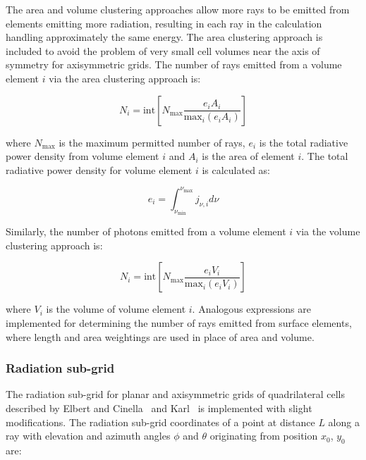 \noindent The area and volume clustering approaches allow more rays to be emitted from elements emitting more radiation, resulting in each ray in the calculation handling approximately the same energy.
The area clustering approach is included to avoid the problem of very small cell volumes near the axis of symmetry for axisymmetric grids.
The number of rays emitted from a volume element $i$ via the area clustering approach is:

 \begin{equation}
 N_{i} = \text{int} \left [ N_{\text{max}} \frac{ e_{i} A_i }{ \text{max}_i ( e_{i} A_i ) } \right ] \label{eq:N_photons}
\end{equation}

\noindent where $N_{\text{max}}$ is the maximum permitted number of rays, $e_{i}$ is the total radiative power density from volume element $i$ and $A_i$ is the area of element $i$.
The total radiative power density for volume element $i$ is calculated as:

\begin{equation}
 e_i = \int_{\nu_{\text{min}}}^{\nu_{\text{max}}} j_{\nu,i} d \nu
\end{equation}

Similarly, the number of photons emitted from a volume element $i$ via the volume clustering approach is:

 \begin{equation}
 N_{i} = \text{int} \left [ N_{\text{max}} \frac{ e_{i} V_i }{ \text{max}_i ( e_{i} V_i ) } \right ] \label{eq:N_photons_vol_clustering}
\end{equation}

\noindent where $V_i$ is the volume of volume element $i$.
Analogous expressions are implemented for determining the number of rays emitted from surface elements, where length and area weightings are used in place of area and volume.

\subsubsection{Radiation sub-grid}
\label{sec:radiation_subgrid}

The radiation sub-grid for planar and axisymmetric grids of quadrilateral cells described by Elbert and Cinella~\cite{elbert_cinnella} and Karl~\cite{karl2001} is implemented with slight modifications.
The radiation sub-grid coordinates of a point at distance $L$ along a ray with elevation and azimuth angles $\phi$ and $\theta$ originating from position $x_0$, $y_0$ are:


